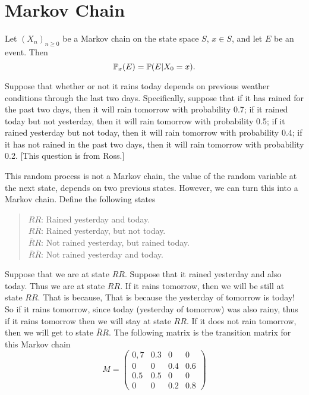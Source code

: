 \chapter{Markov Chain}

\begin{notation}
	Let $(X_n)_{n\geq0}$ be a Markov chain on the state space $S$, $x\in S$, and let $E$ be an event. Then
	\[  \mathbb{P}_x(E) = \mathbb{P}(E|X_0=x) . \]
\end{notation}


\begin{example}
	Suppose that whether or not it rains today depends on previous weather conditions through the last two days. Specifically, suppose that if it has rained for the past two days, then it will rain tomorrow with probability 0.7; if it rained today but not yesterday, then it will rain tomorrow with probability 0.5; if it rained yesterday but not today, then it will rain tomorrow with probability 0.4; if it has not rained in the past two days, then it will rain tomorrow with probability 0.2. [This question is from Ross.]
	\begin{solution}
		This random process is not a Markov chain, the value of the random variable at the next state, depends on two previous states. However, we can turn this into a Markov chain. Define the following states
		\begin{quote}
			$RR$: Rained yesterday and today.\\
			$R\overline{R}$: Rained yesterday, but not today.\\
			$\overline{R}R$: Not rained yesterday, but rained today.\\
			$\overline{R}\overline{R}$: Not rained yesterday and today.
		\end{quote}
		Suppose that we are at state $RR$. Suppose that it rained yesterday and also today. Thus we are at state $RR$. If it rains tomorrow, then we will be still at state $RR$. That is because, That is because the yesterday of tomorrow is today! So if it rains tomorrow, since today (yesterday of tomorrow) was also rainy, thus if it rains tomorrow then we will stay at state $RR$. If it does not rain tomorrow, then we will get to state $\overline{R}R$. The following matrix is the transition matrix for this Markov chain
		\[M = \begin{pmatrix}
			0,7 & 0.3 & 0 & 0 \\
			0 & 0 & 0.4 & 0.6 \\
			0.5 & 0.5 & 0 & 0 \\
			0 & 0 & 0.2 & 0.8
		\end{pmatrix}\]
	\end{solution}
\end{example}


